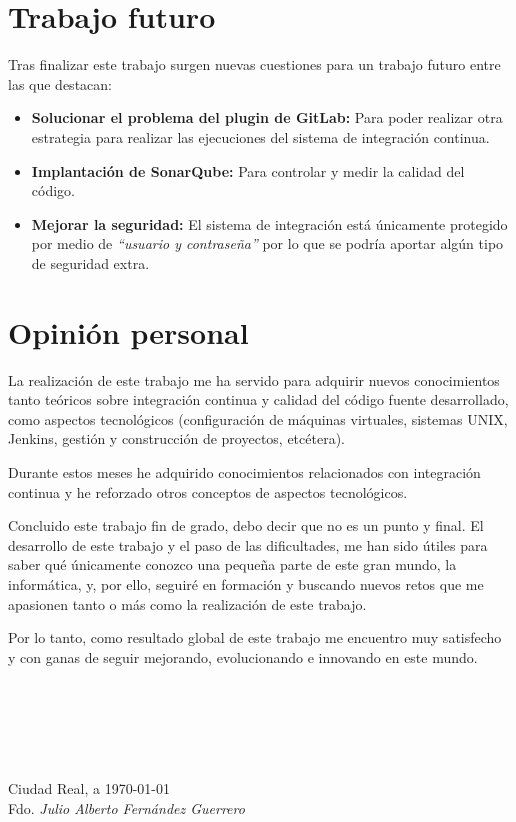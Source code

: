 \section{Trabajo futuro}

Tras finalizar este trabajo surgen nuevas cuestiones para un trabajo futuro entre las que destacan:

\begin{itemize}
\item \textbf{Solucionar el problema del plugin de GitLab:} Para poder realizar otra estrategia para realizar las ejecuciones del sistema de integración continua.
\item \textbf{Implantación de SonarQube:} Para controlar y medir la calidad del código.
\item \textbf{Mejorar la seguridad:} El sistema de integración está únicamente protegido por medio de \textit{``usuario y contraseña''} por lo que se podría aportar algún tipo de seguridad extra.
\end{itemize}

\section{Opinión personal}

La realización de este trabajo me ha servido para adquirir nuevos conocimientos tanto teóricos sobre integración continua y calidad del código fuente desarrollado, como aspectos tecnológicos (configuración de máquinas virtuales, sistemas UNIX, Jenkins, gestión y construcción de proyectos, etcétera).

Durante estos meses he adquirido conocimientos relacionados con integración continua y he reforzado otros conceptos de aspectos tecnológicos.

Concluido este trabajo fin de grado, debo decir que no es un punto y final. El desarrollo de este trabajo y el paso de las dificultades, me han sido útiles para saber qué únicamente conozco una pequeña parte de este gran mundo, la informática, y, por ello, seguiré en formación y buscando nuevos retos que me apasionen tanto o más como la realización de este trabajo.

Por lo tanto, como resultado global de este trabajo me encuentro muy satisfecho y con ganas de seguir mejorando, evolucionando e innovando en este mundo.\\ \\ \\ \\ \\ \\

\begin{flushright}
Ciudad Real, a \today\\
Fdo. \textit{Julio Alberto Fernández Guerrero}
\end{flushright}
